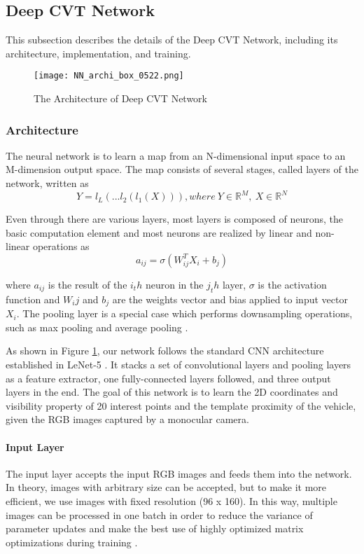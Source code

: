 \subsection{Deep CVT Network}
\label{network}
This subsection describes the details of the Deep CVT Network, including its architecture, implementation, and training.

\begin{figure}[h]		
	\texttt{[image: NN\_archi\_box\_0522.png]}
	\caption{The Architecture of Deep CVT Network}
	\centering
	\label{figure:nn_archi}
\end{figure}

\subsubsection{Architecture}
The neural network is to learn a map from an N-dimensional  input space to an M-dimension output space. The map consists of several stages, called layers of the network, written as
\begin{equation}
Y = l_L(...l_2(l_1(X))), where ~Y \in {\mathbb{R}^M}, ~X \in {\mathbb{R}^N}
\end{equation}

Even through there are various layers, most layers  is composed of neurons, the basic computation element and most neurons are realized by linear and non-linear operations as 
\begin{equation}
a_{ij} = \sigma(W_{ij}^T X_i +b_j)
\end{equation}

where $a_{ij}$ is the result of the $i_th$ neuron in the $j_th$ layer, $\sigma$ is the activation function and $W_ij$ and $b_j$ are the weights vector and bias applied to input vector $X_i$.  The pooling layer is a special case which performs downsampling operations, such as max pooling \cite{Boureau:2010} and average pooling \cite{6460871}.

As shown in Figure \ref{figure:nn_archi}, our network follows the standard CNN architecture established in LeNet-5 \cite{726791}. It stacks a set of convolutional layers and pooling layers as a feature extractor, \tbd one fully-connected layers followed, and three output layers in the end. The goal of this network is to learn the 2D coordinates and visibility property of 20 interest points and the template proximity of the vehicle, given the RGB images captured by a monocular camera.

\paragraph{Input Layer}
The input layer accepts the input RGB images and feeds them into the network. In theory, images with arbitrary size can be accepted, but to make it more efficient, we use images with fixed resolution (96 x 160).  In this way, multiple images can be processed in one batch in order to reduce the variance of parameter updates and make the best use of highly optimized matrix optimizations during training \cite{DBLP:journals/corr/Ruder16}.

